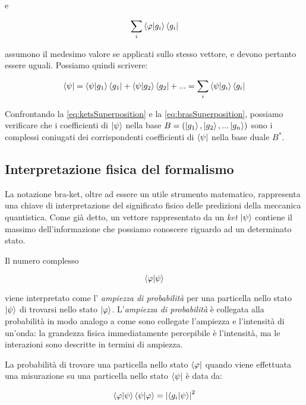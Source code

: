 e

	\[
		\sum_i \braket{\varphi}{g_i} \bra{g_i}
	\]


assumono il medesimo valore se applicati sullo stesso vettore, e devono pertanto essere uguali. Possiamo quindi scrivere:

	\begin{equation} \label{eq:brasSuperposition}
		\bra{\psi} = \braket{\psi}{g_1} \bra{g_1} + \braket{\psi}{g_2} \bra{g_2} + ... = \sum_i \braket{\psi}{g_i} \bra{g_i}
	\end{equation}

Confrontando la \eqref{eq:ketsSuperposition} e la \eqref{eq:brasSuperposition}, possiamo verificare che i coefficienti di $\ket{\psi}$ nella base $B = (\ket{g_1}, \ket{g_2},... \ket{g_n})$ sono i complessi coniugati dei corrispondenti coefficienti di $\bra{\psi}$ nella base duale $B^*$.

\subsection{Interpretazione fisica del formalismo}

La notazione bra-ket, oltre ad essere un utile strumento matematico, rappresenta una chiave di interpretazione del significato fisico delle predizioni della meccanica quantistica. Come già detto, un vettore rappresentato da un \textit{ket} $\ket{\psi}$ contiene il massimo dell'informazione che possiamo conoscere riguardo ad un determinato stato. 

Il numero complesso 

	\[
		\braket{\varphi}{\psi}
	\]

viene interpretato come l' \textit{ampiezza di probabilità} per una particella nello stato $\ket{\psi}$ di trovarsi nello stato $\ket{\varphi}$. L'\textit{ampiezza di probabilità} \`e collegata alla probabilità in modo analogo a come sono collegate l'ampiezza e l'intensità di un'onda: la grandezza fisica immediatamente percepibile \`e l'intensità, ma le interazioni sono descritte in termini di ampiezza.

La probabilità di trovare una particella nello stato $\bra{\varphi}$ quando viene effettuata una misurazione su una particella nello stato $\bra{\psi}$ \`e data da:

	\begin{equation} \label{eq:braKetAsProbability}
		\braket{\varphi}{\psi} \braket{\psi}{\varphi} = \left | \braket{g_i}{\psi} \right |^2
	\end{equation}

